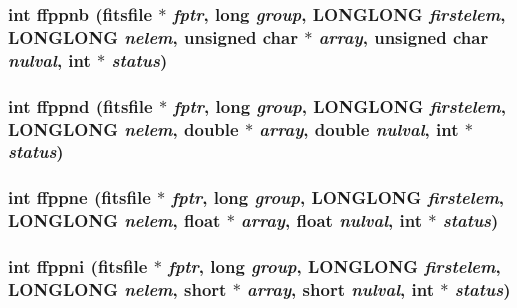 \subsubsection{\setlength{\rightskip}{0pt plus 5cm}int ffppnb (\bf{fitsfile} $\ast$ {\em fptr}, long {\em group}, \bf{LONGLONG} {\em firstelem}, \bf{LONGLONG} {\em nelem}, unsigned char $\ast$ {\em array}, unsigned char {\em nulval}, int $\ast$ {\em status})}\label{test_2shm__client_2fitsio_8h_38152248c04b8b4ff9f813cd636013a4}


\subsubsection{\setlength{\rightskip}{0pt plus 5cm}int ffppnd (\bf{fitsfile} $\ast$ {\em fptr}, long {\em group}, \bf{LONGLONG} {\em firstelem}, \bf{LONGLONG} {\em nelem}, double $\ast$ {\em array}, double {\em nulval}, int $\ast$ {\em status})}\label{test_2shm__client_2fitsio_8h_dbce44e4863160818dafc8a7e74df364}


\subsubsection{\setlength{\rightskip}{0pt plus 5cm}int ffppne (\bf{fitsfile} $\ast$ {\em fptr}, long {\em group}, \bf{LONGLONG} {\em firstelem}, \bf{LONGLONG} {\em nelem}, float $\ast$ {\em array}, float {\em nulval}, int $\ast$ {\em status})}\label{test_2shm__client_2fitsio_8h_01aa3f24254f8d3895463d830679fc52}


\subsubsection{\setlength{\rightskip}{0pt plus 5cm}int ffppni (\bf{fitsfile} $\ast$ {\em fptr}, long {\em group}, \bf{LONGLONG} {\em firstelem}, \bf{LONGLONG} {\em nelem}, short $\ast$ {\em array}, short {\em nulval}, int $\ast$ {\em status})}\label{test_2shm__client_2fitsio_8h_784592ce7e18c4280a1956b6f39cc70f}


